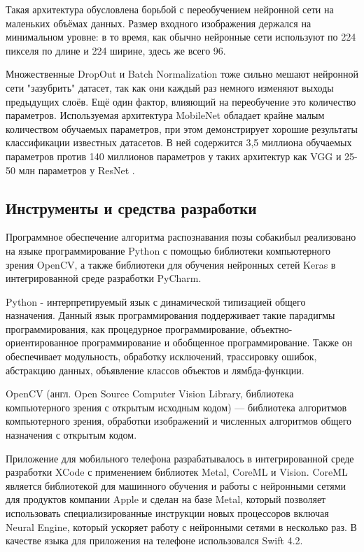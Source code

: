 Такая архитектура обусловлена борьбой с переобучением нейронной сети на маленьких объёмах данных. Размер входного изображения держался на минимальном уровне: в то время, как обычно нейронные сети используют по 224 пикселя по длине и 224 ширине, здесь же всего 96. 

Множественные DropOut и Batch Normalization тоже сильно мешают нейронной сети "зазубрить" датасет, так как они каждый раз немного изменяют выходы предыдущих слоёв. Ещё один фактор, влияющий на переобучение это количество параметров. Используемая архитектура MobileNet обладает крайне малым количеством обучаемых параметров, при этом демонстрирует хорошие результаты классификации известных датасетов.\cite{mobilenet} В ней содержится 3,5 миллиона обучаемых параметров против 140 миллионов параметров у таких архитектур как VGG\cite{vgg} и 25-50 млн параметров у ResNet \cite{resnet}.

\subsection{Инструменты и средства разработки}\label{ide}
Программное обеспечение алгоритма распознавания позы собакибыл реализовано на языке программирование Python с помощью библиотеки компьютерного зрения OpenCV, а также библиотеки для обучения нейронных сетей Keras в интегрированной среде разработки PyCharm.

Python - интерпретируемый язык с динамической типизацией общего назначения. Данный язык программирования поддерживает такие парадигмы программирования, как процедурное программирование, объектно-ориентированное программирование и обобщенное программирование. Также он обеспечивает модульность, обработку исключений, трассировку ошибок, абстракцию данных, объявление классов объектов и лямбда-функции.

OpenCV (англ. Open Source Computer Vision Library, библиотека компьютерного зрения с открытым исходным кодом) — библиотека алгоритмов компьютерного зрения, обработки изображений и численных алгоритмов общего назначения с открытым кодом.

Приложение для мобильного телефона разрабатывалось в интегрированной среде разработки XCode с применением библиотек Metal, CoreML и Vision. CoreML является библиотекой для машинного обучения и работы с нейронными сетями для продуктов компании Apple и сделан на базе Metal, который позволяет использовать специализированные инструкции новых процессоров включая Neural Engine, который ускоряет работу с нейронными сетями в несколько раз. В качестве языка для приложения на телефоне использовался Swift 4.2. 